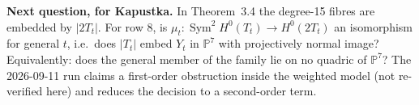 \documentclass[10pt,a4paper]{article}
\theoremstyle{plain}
\theoremstyle{definition}
\theoremstyle{remark}
\begin{document}
\noindent\textbf{Next question, for Kapustka.} In Theorem~3.4 the
degree-15 fibres are embedded by $|2T_t|$. For row 8, is
$\mu_t:\operatorname{Sym}^2H^0(T_t)\to H^0(2T_t)$ an isomorphism
for general $t$, i.e.\ does $|T_t|$ embed $Y_t$ in $\mathbb{P}^7$
with projectively normal image? Equivalently: does the general
member of the family lie on no quadric of $\mathbb{P}^7$? The
2026-09-11 run claims a first-order obstruction inside the weighted
model (not re-verified here) and reduces the decision to a
second-order term.
\end{document}
